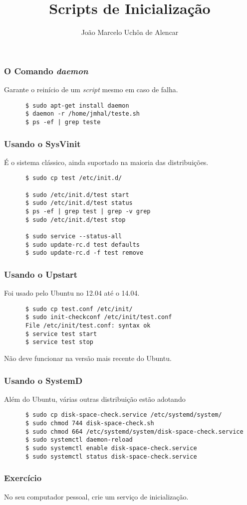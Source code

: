 \documentclass{beamer}
\title{Scripts de Inicialização}
\author[João Marcelo Uchôa de Alencar]{João Marcelo Uchôa de Alencar}
\institute{Universidade Federal do Ceará - Quixadá}
\begin{document}
   \begin{frame}
      \titlepage
   \end{frame}

   \begin{frame}[fragile]
      \frametitle{O Comando \textit{daemon}}
      Garante o reinício de um \textit{script} mesmo em caso de falha. 
      \begin{verbatim}
      $ sudo apt-get install daemon
      $ daemon -r /home/jmhal/teste.sh
      $ ps -ef | grep teste
      \end{verbatim}
\end{frame}

   \begin{frame}[fragile]
      \frametitle{Usando o SysVinit}
      É o sistema clássico, ainda suportado na maioria das distribuições.
      \begin{verbatim}
      $ sudo cp test /etc/init.d/
      
      $ sudo /etc/init.d/test start
      $ sudo /etc/init.d/test status
      $ ps -ef | grep test | grep -v grep 
      $ sudo /etc/init.d/test stop

      $ sudo service --status-all
      $ sudo update-rc.d test defaults
      $ sudo update-rc.d -f test remove
      \end{verbatim}
\end{frame}

   \begin{frame}[fragile]
      \frametitle{Usando o Upstart}
      Foi usado pelo Ubuntu no 12.04 até o 14.04.
      \begin{verbatim}
      $ sudo cp test.conf /etc/init/
      $ sudo init-checkconf /etc/init/test.conf
      File /etc/init/test.conf: syntax ok
      $ service test start
      $ service test stop
      \end{verbatim}
      Não deve funcionar na versão mais recente do Ubuntu.
\end{frame}

   \begin{frame}[fragile]
      \frametitle{Usando o SystemD}
      Além do Ubuntu, várias outras distribuição estão adotando
      \scriptsize
      \begin{verbatim}
      $ sudo cp disk-space-check.service /etc/systemd/system/
      $ sudo chmod 744 disk-space-check.sh
      $ sudo chmod 664 /etc/systemd/system/disk-space-check.service
      $ sudo systemctl daemon-reload
      $ sudo systemctl enable disk-space-check.service
      $ sudo systemctl status disk-space-check.service 
      \end{verbatim}
\end{frame}


   \begin{frame}
      \frametitle{Exercício}
      No seu computador pessoal, crie um serviço de inicialização.
   \end{frame}
\end{document}

